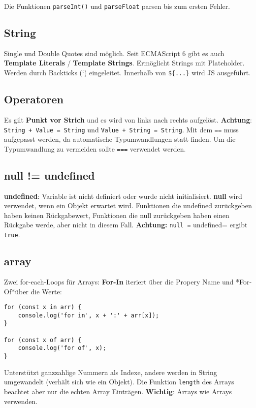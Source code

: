 \documentclass[11pt,twoside,landscape]{article}
\begin{document}
\begin{multicols}{4}
Die Funktionen \texttt{parseInt()} und \texttt{parseFloat} parsen bis zum ersten Fehler.


\subsection{String}
\label{sec:org074a366}
Single und Double Quotes sind möglich. Seit ECMAScript 6 gibt es auch \textbf{Template Literals} / \textbf{Template Strings}. Ermöglicht Strings mit Plateholder. Werden durch Backticks (`) eingeleitet. Innerhalb von \texttt{\$\{...\}} wird JS ausgeführt.

\subsection{Operatoren}
\label{sec:orge810ead}
Es gilt \textbf{Punkt vor Strich} und es wird von links nach rechts aufgelöst. \textbf{Achtung}: \texttt{String + Value = String} und \texttt{Value + String = String}.
Mit dem \texttt{==} muss aufgepasst werden, da automatische Typumwandlungen statt finden. Um die Typumwandlung zu vermeiden sollte \texttt{===} verwendet werden.

\subsection{null != undefined}
\label{sec:orga03a436}
\textbf{undefined}: Variable ist nicht definiert oder wurde nicht initialisiert. \textbf{null} wird verwendet, wenn ein Objekt erwartet wird. Funktionen die undefined zurückgeben haben keinen Rückgabewert, Funktionen die null zurückgeben haben einen Rückgabe werde, aber nicht in diesem Fall. \textbf{Achtung:} \texttt{null =} undefined= ergibt \texttt{true}.

\subsection{array}
\label{sec:orgec80161}
Zwei for-each-Loops für Arrays: \textbf{For-In} iteriert über die Propery Name und *For-Of*über die Werte:
\lstset{language=js,label= ,caption= ,captionpos=b,numbers=none}
\begin{lstlisting}
for (const x in arr) {
    console.log('for in', x + ':' + arr[x]);
}

for (const x of arr) {
    console.log('for of', x);
}
\end{lstlisting}
Unterstützt ganzzahlige Nummern als Indexe, andere werden in String umgewandelt (verhält sich wie ein Objekt). Die Funktion \texttt{length} des Arrays beachtet aber nur die echten Array Einträgen. \textbf{Wichtig}: Arrays wie Arrays verwenden.


\end{multicols}
\end{document}
